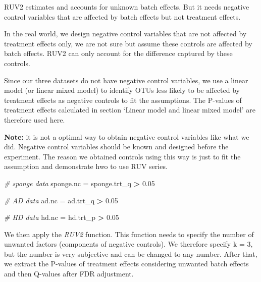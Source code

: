 \documentclass[]{book}
\newenvironment{Shaded}{\begin{snugshade}}{\end{snugshade}}
\newcommand{\FloatTok}[1]{\textcolor[rgb]{0.00,0.00,0.81}{#1}}
\newcommand{\StringTok}[1]{\textcolor[rgb]{0.31,0.60,0.02}{#1}}
\newcommand{\CommentTok}[1]{\textcolor[rgb]{0.56,0.35,0.01}{\textit{#1}}}
\newcommand{\OperatorTok}[1]{\textcolor[rgb]{0.81,0.36,0.00}{\textbf{#1}}}
\newcommand{\NormalTok}[1]{#1}
\begin{document}
RUV2 estimates and accounts for unknown batch effects. But it needs
negative control variables that are affected by batch effects but not
treatment effects.

In the real world, we design negative control variables that are not
affected by treatment effects only, we are not sure but assume these
controls are affected by batch effects. RUV2 can only account for the
difference captured by these controls.

Since our three datasets do not have negative control variables, we use
a linear model (or linear mixed model) to identify OTUs less likely to
be affected by treatment effects as negative controls to fit the
assumptions. The P-values of treatment effects calculated in section
`Linear model and linear mixed model' are therefore used here.

\textbf{Note:} it is not a optimal way to obtain negative control
variables like what we did. Negative control variables should be known
and designed before the experiment. The reason we obtained controls
using this way is just to fit the assumption and demonstrate hwo to use
RUV series.

\begin{Shaded}
\begin{Highlighting}[]
\CommentTok{# sponge data}
\NormalTok{sponge.nc =}\StringTok{ }\NormalTok{sponge.trt_q }\OperatorTok{>}\StringTok{ }\FloatTok{0.05}

\CommentTok{# AD data}
\NormalTok{ad.nc =}\StringTok{ }\NormalTok{ad.trt_q }\OperatorTok{>}\StringTok{ }\FloatTok{0.05}

\CommentTok{# HD data}
\NormalTok{hd.nc =}\StringTok{ }\NormalTok{hd.trt_p }\OperatorTok{>}\StringTok{ }\FloatTok{0.05}
\end{Highlighting}
\end{Shaded}

We then apply the \emph{RUV2} function. This function needs to specify
the number of unwanted factors (components of negative controls). We
therefore specify k = 3, but the number is very subjective and can be
changed to any number. After that, we extract the P-values of treatment
effects considering unwanted batch effects and then Q-values after FDR
adjustment.
\end{document}
